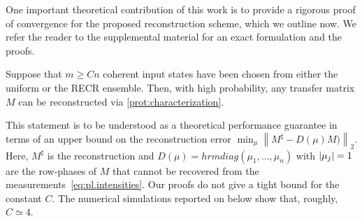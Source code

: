 
One important theoretical contribution of this work is to provide a rigorous proof of convergence for the proposed reconstruction scheme, which we outline now.
We refer the reader to the supplemental material for an exact formulation and the proofs.
\begin{theorem}%
  \label{thm:performance_guarantee}
  Suppose that $m \geq Cn$ coherent input states have been chosen from either the uniform or the RECR ensemble.
  Then, with high probability, any transfer matrix ${M}$ can be reconstructed via \cref{prot:characterization}.
\end{theorem}

This statement is to be understood as a theoretical performance guarantee in terms of an upper bound on the reconstruction error
\(
  \min_{{\mu}}\left\| {M}^\sharp -  {D} ({\mu}) {M}) \right\|_2.
\)
Here, ${M}^\sharp$ is the reconstruction and ${D}(\mu) = hrm{diag}(\mu_1, \ldots, \mu_n)$ with ${\vert\mu_j\vert} = 1$ are the row-phases of ${M}$ that cannot be  recovered from the measurements~\eqref{eq:pl.intensities}.
Our proofs do not give a tight bound for the constant $C$.
The numerical simulations reported on below show that, roughly, $C\simeq 4$.



